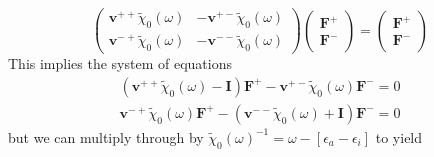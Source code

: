 \begin{equation}
    \begin{pmatrix}
\mathbf{v}^{++}\tilde{\chi}_{0}\left(\omega\right) & -\mathbf{v}^{+-}\tilde{\chi}_{0}\left(\omega\right) \\
\mathbf{v}^{-+}\tilde{\chi}_{0}\left(\omega\right) & -\mathbf{v}^{--}\tilde{\chi}_{0}\left(\omega\right)
\end{pmatrix}
\begin{pmatrix}
\mathbf{F}^{+} \\
\mathbf{F}^{-}
\end{pmatrix}
=
\begin{pmatrix}
\mathbf{F}^{+} \\
\mathbf{F}^{-}
\end{pmatrix}
\end{equation}
This implies the system of equations
\begin{align}
    \left(\mathbf{v}^{++}\tilde{\chi}_{0}\left(\omega\right) - \mathbf{I}\right) \mathbf{F}^{+} - \mathbf{v}^{+-}\tilde{\chi}_{0}\left(\omega\right) \mathbf{F}^{-} = 0 \\
    \mathbf{v}^{-+}\tilde{\chi}_{0}\left(\omega\right) \mathbf{F}^{+} - \left(\mathbf{v}^{--}\tilde{\chi}_{0}\left(\omega\right) + \mathbf{I}\right) \mathbf{F}^{-} = 0
\end{align}
but we can multiply through by $\tilde{\chi}_{0}\left(\omega\right)^{-1} = \omega - \left[\epsilon_{a}-\epsilon_{i}\right]$ to yield
